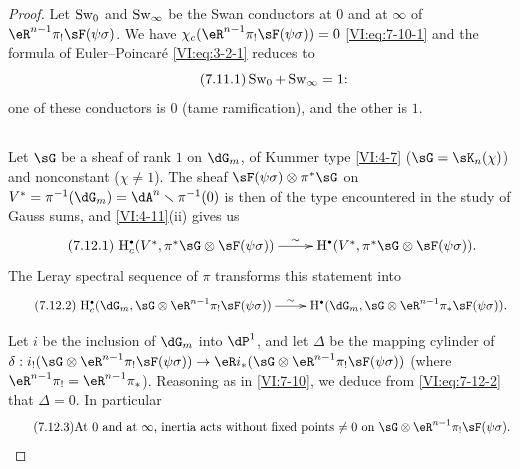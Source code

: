 \begin{proof}[Proof]
Let $\operatorname{Sw}_0$ and $\operatorname{Sw}_\infty$ be the Swan conductors at $0$ and at 
$\infty$ of $\eR^{n-1} \pi_! \sF(\psi\sigma)$. We have 
$\chi_c(\eR^{n-1} \pi_! \sF(\psi\sigma))=0$ \eqref{VI:eq:7-10-1} and the formula 
of Euler--Poincaré \eqref{VI:eq:3-2-1} reduces to 
\begin{equation*}\tag{7.11.1}\label{VI:eq:7-11-1}
  \operatorname{Sw}_0 + \operatorname{Sw}_\infty =1 \text{:} 
\end{equation*}
one of these conductors is $0$ (tame ramification), and the other is $1$. 





\subsection{}\label{VI:7-12}

Let $\sG$ be a sheaf of rank $1$ on $\dG_m$, of Kummer type 
\ref{VI:4-7} ($\sG=\sK_n(\chi)$) and nonconstant ($\chi\ne 1$). The sheaf 
$\sF(\psi\sigma)\otimes \pi^\ast \sG$ on 
$V^\ast=\pi^{-1}(\dG_m) = \dA^n\setminus \pi^{-1}(0)$ is then of the type 
encountered in the study of Gauss sums, and \ref{VI:4-11}(ii) gives us 
\begin{equation*}\tag{7.12.1}\label{VI:eq:7-12-1}
\xymatrix{
  \h_c^\bullet(V^\ast,\pi^\ast\sG\otimes \sF(\psi\sigma)) \ar[r]^-\sim 
    & \h^\bullet(V^\ast,\pi^\ast \sG\otimes \sF(\psi\sigma)) \text{.} 
}
\end{equation*}
The Leray spectral sequence of $\pi$ transforms this statement into 
\begin{equation*}\tag{7.12.2}\label{VI:eq:7-12-2}
\xymatrix{
  \h_c^\bullet(\dG_m,\sG\otimes \eR^{n-1} \pi_! \sF(\psi\sigma)) \ar[r]^-\sim 
    & \h^\bullet(\dG_m,\sG\otimes \eR^{n-1} \pi_\ast \sF(\psi\sigma)) \text{.} 
}
\end{equation*}

Let $i$ be the inclusion of $\dG_m$ into $\dP^1$, and let $\Delta$ be the mapping cylinder 
of 
  $\delta:i_!(\sG\otimes \eR^{n-1}\pi_! \sF(\psi\sigma))\to \eR i_\ast (\sG\otimes \eR^{n-1} \pi_! \sF(\psi\sigma))$
(where $\eR^{n-1} \pi_! = \eR^{n-1}\pi_\ast$). Reasoning as in 
\ref{VI:7-10}, we deduce from \eqref{VI:eq:7-12-2} that $\Delta=0$. In 
particular 
\begin{equation*}\tag{7.12.3}\label{VI:eq:7-12-3}
  \text{At $0$ and at $\infty$, inertia acts without fixed points $\ne 0$ on $\sG\otimes \eR^{n-1}\pi_! \sF(\psi\sigma)$.}
\end{equation*}


\end{proof}
